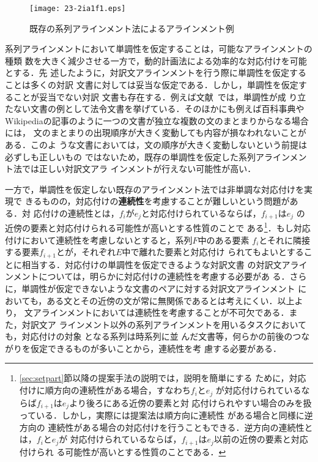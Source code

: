 \documentclass[japanese]{jnlp_1.4}
\begin{document}
\begin{figure}[t]
\begin{center}
\texttt{[image: 23-2ia1f1.eps]}
\end{center}
\caption{既存の系列アラインメント法によるアラインメント例}
\label{fig:prevwork}
\end{figure}

系列アラインメントにおいて単調性を仮定することは，可能なアラインメントの種類
数を大きく減少させる一方で，動的計画法による効率的な対応付けを可能とする．先
述したように，対訳文アラインメントを行う際に単調性を仮定することは多くの対訳
文書に対しては妥当な仮定である．しかし，単調性を仮定することが妥当でない対訳
文書も存在する．例えば文献~\cite{quan-kit-song:2013:ACL2013}では，単調性が成
り立たない文書の例として法令文書を挙げている．そのほかにも例えば百科事典や
Wikipediaの記事のように一つの文書が独立な複数の文のまとまりからなる場合には，
文のまとまりの出現順序が大きく変動しても内容が損なわれないことがある．このよ
うな文書においては，文の順序が大きく変動しないという前提は必ずしも正しいもの
ではないため，既存の単調性を仮定した系列アラインメント法では正しい対訳文アラ
インメントが行えない可能性が高い．

一方で，単調性を仮定しない既存のアラインメント法では非単調な対応付けを実現で
きるものの，対応付けの\textbf{連続性}を考慮することが難しいという問題がある．対
応付けの連続性とは，$f_i$が$e_j$と対応付けられているならば，$f_{i+1}$は$e_j$
の近傍の要素と対応付けられる可能性が高いとする性質のことで
ある\footnote{\ref{sec:setpart}節以降の提案手法の説明では，説明を簡単にする
ために，対応付けに順方向の連続性がある場合，すなわち$f_i$と$e_j$
  が対応付けられているならば$f_{i+1}$は$e_{j}$より後ろにある近傍の要素と対
  応付けられやすい場合のみを扱っている．しかし，実際には提案法は順方向に連続性
  がある場合と同様に逆方向の
  連続性がある場合の対応付けを行うこともできる．逆方向の連続性とは，$f_i$と$e_j$が
  対応付けられているならば，$f_{i+1}$は$e_{j}$以前の近傍の要素と対応付けられ
  る可能性が高いとする性質のことである．}．もし対応付けにおいて連続性を考慮しないとすると，系列$F$中のある要素
$f_i$とそれに隣接する要素$f_{i+1}$とが，それぞれ$E$中で離れた要素と対応付け
られてもよいとすることに相当する．対応付けの単調性を仮定できるような対訳文書
の対訳文アラインメントについては，明らかに対応付けの連続性を考慮する必要があ
る．さらに，単調性が仮定できないような文書のペアに対する対訳文アラインメント
においても，ある文とその近傍の文が常に無関係であるとは考えにくい．以上より，
文アラインメントにおいては連続性を考慮することが不可欠である．また，対訳文ア
ラインメント以外の系列アラインメントを用いるタスクにおいても，対応付けの対象
となる系列は時系列に並
んだ文書等，何らかの前後のつながりを仮定できるものが多いことから，連続性を考
慮する必要がある．
\end{document}
